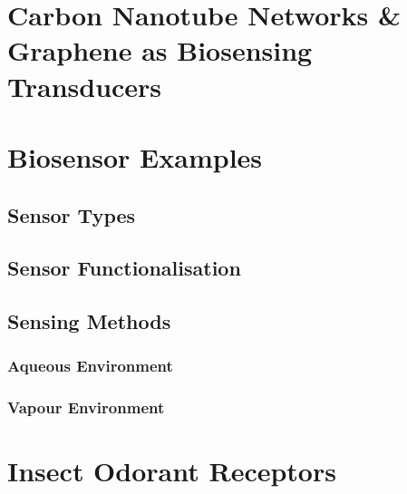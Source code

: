 \documentclass[
  a4paper,
]{scrbook}
\begin{document}
\hypertarget{carbon-nanotube-networks-graphene-as-biosensing-transducers}{%
\section{Carbon Nanotube Networks \& Graphene as Biosensing
Transducers}\label{carbon-nanotube-networks-graphene-as-biosensing-transducers}}

\hypertarget{biosensor-examples}{%
\section{Biosensor Examples}\label{biosensor-examples}}

\hypertarget{sensor-types}{%
\subsection{Sensor Types}\label{sensor-types}}

\hypertarget{sensor-functionalisation}{%
\subsection{Sensor Functionalisation}\label{sensor-functionalisation}}

\hypertarget{sec-biosensor-methods}{%
\subsection{Sensing Methods}\label{sec-biosensor-methods}}

\hypertarget{aqueous-environment}{%
\subsubsection*{Aqueous Environment}\label{aqueous-environment}}

\hypertarget{vapour-environment}{%
\subsubsection*{Vapour Environment}\label{vapour-environment}}

\hypertarget{insect-odorant-receptors}{%
\section{Insect Odorant Receptors}\label{insect-odorant-receptors}}
\end{document}
